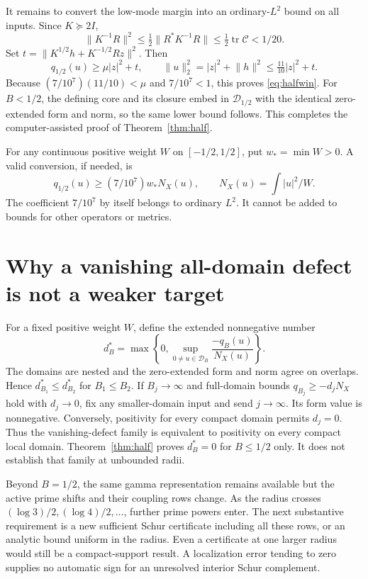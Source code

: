 \documentclass[11pt]{article}
\newcommand{\norm}[1]{\lVert#1\rVert}
\begin{document}
It remains to convert the low-mode margin into an ordinary-$L^2$ bound
on all inputs. Since $K\succeq2I$,
\[
 \norm{K^{-1}R}^2\le\tfrac12\norm{R^*K^{-1}R}
 \le\tfrac12\operatorname{tr}\mathcal C<1/20.
\]
Set $t=\norm{K^{1/2}h+K^{-1/2}Rz}^2$. Then
\[
 q_{1/2}(u)\ge\mu|z|^2+t,\qquad
 \norm u_2^2=|z|^2+\norm h^2\le\tfrac{11}{10}|z|^2+t.
\]
Because $(7/10^7)(11/10)<\mu$ and $7/10^7<1$, this proves
\eqref{eq:halfwin}. For $B<1/2$, the defining core and its closure embed
in $\mathcal D_{1/2}$ with the identical zero-extended form and norm,
so the same lower bound follows. This completes the computer-assisted
proof of Theorem~\ref{thm:half}.

For any continuous positive weight $W$ on $[-1/2,1/2]$, put
$w_* =\min W>0$. A valid conversion, if needed, is
\[
 q_{1/2}(u)\ge(7/10^7)w_* N_X(u),
 \qquad N_X(u)=\int |u|^2/W.
\]
The coefficient $7/10^7$ by itself belongs to ordinary $L^2$.
It cannot be added to bounds for other operators or metrics.

\section{Why a vanishing all-domain defect is not a weaker target}
For a fixed positive weight $W$, define the extended nonnegative number
\[
 d_B^*=\max\left\{0,\sup_{0\ne u\in\mathcal D_B}
                    \frac{-q_B(u)}{N_X(u)}\right\}.
\]
The domains are nested and the zero-extended form and norm agree on
overlaps. Hence $d_{B_1}^*\le d_{B_2}^*$ for $B_1\le B_2$.
If $B_j\to\infty$ and full-domain bounds
$q_{B_j}\ge-d_jN_X$ hold with $d_j\to0$, fix any smaller-domain input
and send $j\to\infty$. Its form value is nonnegative. Conversely,
positivity for every compact domain permits $d_j=0$.
Thus the vanishing-defect family is equivalent to positivity on every
compact local domain. Theorem~\ref{thm:half} proves $d_B^*=0$ for
$B\le1/2$ only. It does not establish that family at unbounded radii.

Beyond $B=1/2$, the same gamma representation remains available but
the active prime shifts and their coupling rows change. As the radius
crosses $(\log3)/2,(\log4)/2,\ldots$, further prime powers enter.
The next substantive requirement is a new sufficient Schur certificate
including all these rows, or an analytic bound uniform in the radius.
Even a certificate at one larger radius would still be a compact-support
result. A localization error tending to zero supplies no automatic sign
for an unresolved interior Schur complement.
\end{document}
